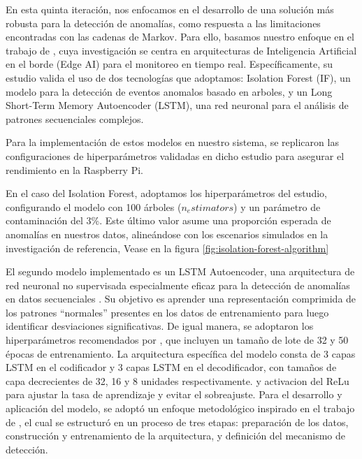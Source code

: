       En esta quinta iteración, nos enfocamos en el desarrollo de una solución más robusta para la detección de anomalías, como respuesta a las limitaciones encontradas con las cadenas de Markov. Para ello, basamos nuestro enfoque en el trabajo de \citeauthor{reis2025edge} \citeyear{reis2025edge}, cuya investigación se centra en arquitecturas de Inteligencia Artificial en el borde (Edge AI) para el monitoreo en tiempo real. Específicamente, su estudio valida el uso de dos tecnologías que adoptamos: Isolation Forest (IF), un modelo para la detección de eventos anomalos basado en arboles, y un Long Short-Term Memory Autoencoder (LSTM), una red neuronal para el análisis de patrones secuenciales complejos.

      Para la implementación de estos modelos en nuestro sistema, se replicaron las configuraciones de hiperparámetros validadas en dicho estudio para asegurar el rendimiento en la Raspberry Pi.

      En el caso del Isolation Forest, adoptamos los hiperparámetros del estudio, configurando el modelo con 100 árboles ($n_estimators$) y un parámetro de contaminación del 3\%. Este último valor asume una proporción esperada de anomalías en nuestros datos, alineándose con los escenarios simulados en la investigación de referencia, Vease en la figura \ref{fig:isolation-forest-algorithm}

      El segundo modelo implementado es un LSTM Autoencoder, una arquitectura de red neuronal no supervisada especialmente eficaz para la detección de anomalías en datos secuenciales \cite{malhotra2015long}. Su objetivo es aprender una representación comprimida de los patrones ``normales'' presentes en los datos de entrenamiento para luego identificar desviaciones significativas. De igual manera, se adoptaron los hiperparámetros recomendados por \citeauthor{reis2025edge} \citeyear{reis2025edge}, que incluyen un tamaño de lote de 32 y 50 épocas de entrenamiento. La arquitectura específica del modelo consta de 3 capas LSTM en el codificador y 3 capas LSTM en el decodificador, con tamaños de capa decrecientes de 32, 16 y 8 unidades respectivamente. y activacion del ReLu para ajustar la tasa de aprendizaje y evitar el sobreajuste.
      Para el desarrollo y aplicación del modelo, se adoptó un enfoque metodológico inspirado en el trabajo de \citeauthor{reis2025edge} \citeyear{reis2025edge}, el cual se estructuró en un proceso de tres etapas: preparación de los datos, construcción y entrenamiento de la arquitectura, y definición del mecanismo de detección.

